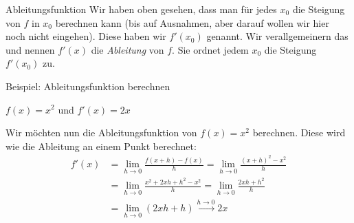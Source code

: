 \begin{bla}{Ableitungsfunktion}
  Wir haben oben gesehen, dass man für jedes $x_0$ die Steigung von $f$ in $x_0$ berechnen kann (bis auf Ausnahmen, aber darauf wollen wir hier noch nicht eingehen). Diese haben wir $f'(x_0)$ genannt. Wir verallgemeinern das und nennen $f'(x)$ die \emph{Ableitung} von $f$. Sie ordnet jedem $x_0$ die Steigung $f'(x_0)$ zu.
\end{bla}



\begin{bla}{Beispiel: Ableitungsfunktion berechnen}
  \begin{marginfigure}
    \caption{$f(x)=x^2$ und $f'(x)=2x$}
  \end{marginfigure}

  Wir möchten nun die Ableitungsfunktion von $f(x)=x^2$ berechnen. Diese wird wie die Ableitung an einem Punkt berechnet: \\
  \begin{equation*}
    \begin{split}
      f'(x) & = \lim\limits_{h \to 0}\frac{f(x+h)-f(x)}{h} = \lim\limits_{h \to 0}\frac{{(x+h)}^2-x^2}{h} \\
			& = \lim\limits_{h \to 0}\frac{x^2+2xh+h^2-x^2}{h} = \lim\limits_{h \to 0}\frac{2xh+h^2}{h} \\
			& = \lim\limits_{h \to 0}(2xh+h)\xrightarrow{h\rightarrow 0}2x
    \end{split}
  \end{equation*}
\end{bla}



